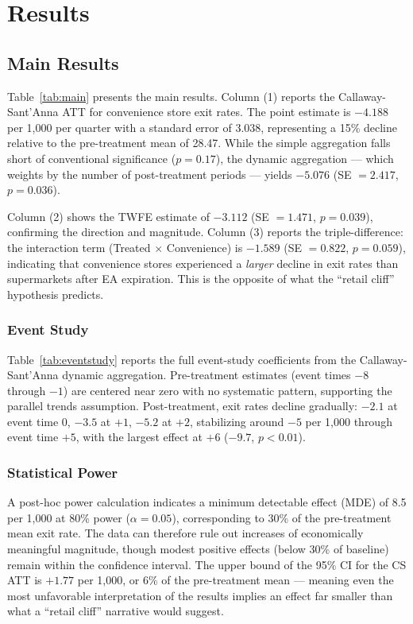 \documentclass[12pt]{article}
\begin{document}
\section{Results}

\subsection{Main Results}



Table~\ref{tab:main} presents the main results. Column (1) reports the Callaway-Sant'Anna ATT for convenience store exit rates. The point estimate is $-4.188$ per 1,000 per quarter with a standard error of 3.038, representing a 15\% decline relative to the pre-treatment mean of 28.47. While the simple aggregation falls short of conventional significance ($p = 0.17$), the dynamic aggregation --- which weights by the number of post-treatment periods --- yields $-5.076$ (SE $= 2.417$, $p = 0.036$).

Column (2) shows the TWFE estimate of $-3.112$ (SE $= 1.471$, $p = 0.039$), confirming the direction and magnitude. Column (3) reports the triple-difference: the interaction term (Treated $\times$ Convenience) is $-1.589$ (SE $= 0.822$, $p = 0.059$), indicating that convenience stores experienced a \textit{larger} decline in exit rates than supermarkets after EA expiration. This is the opposite of what the ``retail cliff'' hypothesis predicts.

\subsubsection*{Event Study} Table~\ref{tab:eventstudy} reports the full event-study coefficients from the Callaway-Sant'Anna dynamic aggregation. Pre-treatment estimates (event times $-8$ through $-1$) are centered near zero with no systematic pattern, supporting the parallel trends assumption. Post-treatment, exit rates decline gradually: $-2.1$ at event time 0, $-3.5$ at $+1$, $-5.2$ at $+2$, stabilizing around $-5$ per 1,000 through event time $+5$, with the largest effect at $+6$ ($-9.7$, $p < 0.01$).



\subsubsection*{Statistical Power} A post-hoc power calculation indicates a minimum detectable effect (MDE) of 8.5 per 1,000 at 80\% power ($\alpha = 0.05$), corresponding to 30\% of the pre-treatment mean exit rate. The data can therefore rule out increases of economically meaningful magnitude, though modest positive effects (below 30\% of baseline) remain within the confidence interval. The upper bound of the 95\% CI for the CS ATT is $+1.77$ per 1,000, or 6\% of the pre-treatment mean --- meaning even the most unfavorable interpretation of the results implies an effect far smaller than what a ``retail cliff'' narrative would suggest.
\end{document}
